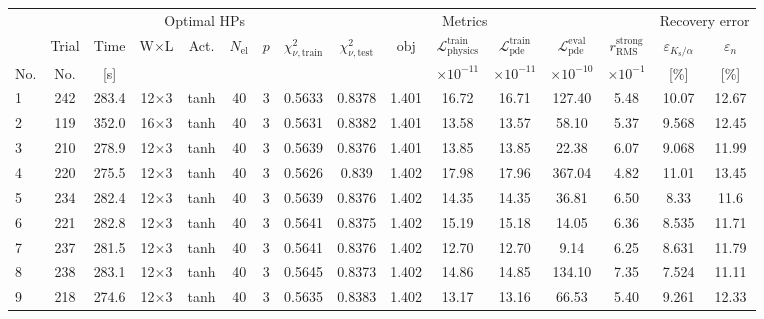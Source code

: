 \begin{tabular}{lcc cccc ccccccc cc}
\toprule
& & & \multicolumn{4}{c}{Optimal HPs} & \multicolumn{7}{c}{Metrics} & \multicolumn{2}{c}{Recovery error} \\
\cmidrule(lr){4-7}\cmidrule(lr){8-14}\cmidrule(lr){15-16}
& Trial & Time & W$\times$L & Act. & $N_{\mathrm{el}}$ & $p$ & $\chi^2_{\nu,\mathrm{train}}$ & $\chi^2_{\nu,\mathrm{test}}$ & $\mathrm{obj}$ & $\mathcal{L}_{\mathrm{physics}}^{\mathrm{train}}$ & $\mathcal{L}_{\mathrm{pde}}^{\mathrm{train}}$ & $\mathcal{L}_{\mathrm{pde}}^{\mathrm{eval}}$ & $r_{\mathrm{RMS}}^{\mathrm{strong}}$ & $\varepsilon_{K_{\mathrm{s}}/\alpha}$ & $\varepsilon_{n}$ \\
No. & No. & [s] &  &  &  &  &  &  &  & $\times 10^{-11}$ & $\times 10^{-11}$ & $\times 10^{-10}$ & $\times 10^{-1}$ & [\%] & [\%] \\
\midrule
  1 & 242 & 283.4 & 12$\times$3 & tanh & 40 & 3 & \num{0.5633} & \num{0.8378} & \num{1.401} & 16.72 & 16.71 & 127.40 & 5.48 & \num{10.07} & \num{12.67} \\
  2 & 119 & 352.0 & 16$\times$3 & tanh & 40 & 3 & \num{0.5631} & \num{0.8382} & \num{1.401} & 13.58 & 13.57 & 58.10 & 5.37 & \num{9.568} & \num{12.45} \\
  3 & 210 & 278.9 & 12$\times$3 & tanh & 40 & 3 & \num{0.5639} & \num{0.8376} & \num{1.401} & 13.85 & 13.85 & 22.38 & 6.07 & \num{9.068} & \num{11.99} \\
  4 & 220 & 275.5 & 12$\times$3 & tanh & 40 & 3 & \num{0.5626} & \num{0.839} & \num{1.402} & 17.98 & 17.96 & 367.04 & 4.82 & \num{11.01} & \num{13.45} \\
  5 & 234 & 282.4 & 12$\times$3 & tanh & 40 & 3 & \num{0.5639} & \num{0.8376} & \num{1.402} & 14.35 & 14.35 & 36.81 & 6.50 & \num{8.33} & \num{11.6} \\
  6 & 221 & 282.8 & 12$\times$3 & tanh & 40 & 3 & \num{0.5641} & \num{0.8375} & \num{1.402} & 15.19 & 15.18 & 14.05 & 6.36 & \num{8.535} & \num{11.71} \\
  7 & 237 & 281.5 & 12$\times$3 & tanh & 40 & 3 & \num{0.5641} & \num{0.8376} & \num{1.402} & 12.70 & 12.70 & 9.14 & 6.25 & \num{8.631} & \num{11.79} \\
  8 & 238 & 283.1 & 12$\times$3 & tanh & 40 & 3 & \num{0.5645} & \num{0.8373} & \num{1.402} & 14.86 & 14.85 & 134.10 & 7.35 & \num{7.524} & \num{11.11} \\
  9 & 218 & 274.6 & 12$\times$3 & tanh & 40 & 3 & \num{0.5635} & \num{0.8383} & \num{1.402} & 13.17 & 13.16 & 66.53 & 5.40 & \num{9.261} & \num{12.33} \\

\end{tabular}

